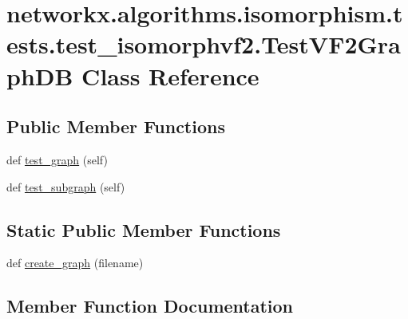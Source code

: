 \hypertarget{classnetworkx_1_1algorithms_1_1isomorphism_1_1tests_1_1test__isomorphvf2_1_1TestVF2GraphDB}{}\section{networkx.\+algorithms.\+isomorphism.\+tests.\+test\+\_\+isomorphvf2.\+Test\+V\+F2\+Graph\+DB Class Reference}
\label{classnetworkx_1_1algorithms_1_1isomorphism_1_1tests_1_1test__isomorphvf2_1_1TestVF2GraphDB}
\subsection*{Public Member Functions}
\begin{DoxyCompactItemize}
\item 
def \hyperlink{classnetworkx_1_1algorithms_1_1isomorphism_1_1tests_1_1test__isomorphvf2_1_1TestVF2GraphDB_ae1dc4ef18507b3855ec90dbe8f404618}{test\+\_\+graph} (self)
\item 
def \hyperlink{classnetworkx_1_1algorithms_1_1isomorphism_1_1tests_1_1test__isomorphvf2_1_1TestVF2GraphDB_ac98cbaf7eb94b5451d3edca2fbfa25f4}{test\+\_\+subgraph} (self)
\end{DoxyCompactItemize}
\subsection*{Static Public Member Functions}
\begin{DoxyCompactItemize}
\item 
def \hyperlink{classnetworkx_1_1algorithms_1_1isomorphism_1_1tests_1_1test__isomorphvf2_1_1TestVF2GraphDB_a49bd7355632e4afa7ff08b196e99b5ff}{create\+\_\+graph} (filename)
\end{DoxyCompactItemize}


\subsection{Member Function Documentation}
\mbox{\label{classnetworkx_1_1algorithms_1_1isomorphism_1_1tests_1_1test__isomorphvf2_1_1TestVF2GraphDB_a49bd7355632e4afa7ff08b196e99b5ff}} 
